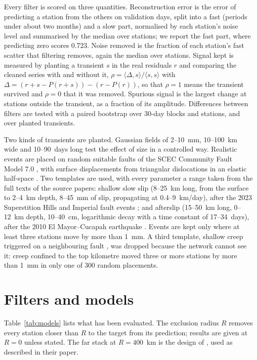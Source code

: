\documentclass[11pt,a4paper]{article}
\begin{document}
Every filter is scored on three quantities. Reconstruction error is the error of predicting a station from the others on validation days, split into a fast (periods under about two months) and a slow part, normalised by each station's noise level and summarised by the median over stations; we report the fast part, where predicting zero scores 0.723. Noise removed is the fraction of each station's fast scatter that filtering removes, again the median over stations. Signal kept is measured by planting a transient $s$ in the real residuals $r$ and comparing the cleaned series with and without it, $\rho = \langle \Delta, s\rangle / \langle s, s\rangle$ with $\Delta = (r+s-P(r+s)) - (r-P(r))$, so that $\rho = 1$ means the transient survived and $\rho = 0$ that it was removed. Spurious signal is the largest change at stations outside the transient, as a fraction of its amplitude. Differences between filters are tested with a paired bootstrap over 30-day blocks and stations, and over planted transients.

Two kinds of transients are planted. Gaussian fields of 2--10~mm, 10--100~km wide and 10--90~days long test the effect of size in a controlled way. Realistic events are placed on random suitable faults of the SCEC Community Fault Model 7.0 \citep{plesch2007,plesch2024cfm}, with surface displacements from triangular dislocations in an elastic half-space \citep{nikkhoo2015}. Two templates are used, with every parameter a range taken from the full texts of the source papers: shallow slow slip (8--25~km long, from the surface to 2--4~km depth, 8--45~mm of slip, propagating at 0.4--9~km/day), after the 2023 Superstition Hills and Imperial fault events \citep{materna2024,vavra2024}; and afterslip (15--50~km long, 0--12~km depth, 10--40~cm, logarithmic decay with a time constant of 17--34~days), after the 2010 El Mayor--Cucapah earthquake \citep{gonzalezortega2014}. Events are kept only where at least three stations move by more than 1~mm. A third template, shallow creep triggered on a neighbouring fault \citep{ramos2020,xu2020}, was dropped because the network cannot see it: creep confined to the top kilometre moved three or more stations by more than 1~mm in only one of 300 random placements.

\section{Filters and models}

Table~\ref{tab:models} lists what has been evaluated. The exclusion radius $R$ removes every station closer than $R$ to the target from its prediction; results are given at $R = 0$ unless stated. The far stack at $R = 400$~km is the design of \citet{bachelot2025}, used as described in their paper.
\end{document}
